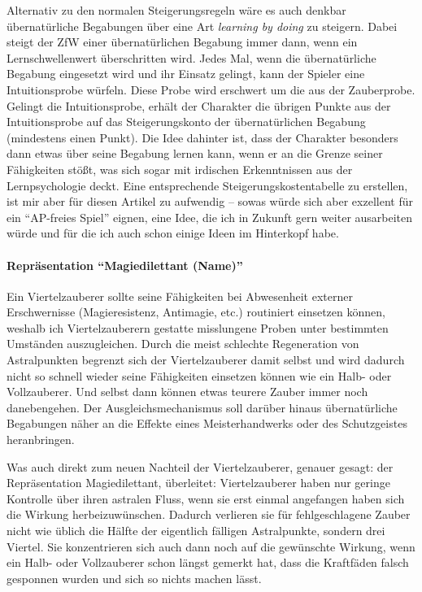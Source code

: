 Alternativ zu den normalen Steigerungsregeln wäre es auch denkbar übernatürliche Begabungen über eine Art \textit{learning by doing} zu steigern. Dabei steigt der ZfW einer übernatürlichen Begabung immer dann, wenn ein Lernschwellenwert überschritten wird. Jedes Mal, wenn die übernatürliche Begabung eingesetzt wird und ihr Einsatz gelingt, kann der Spieler eine Intuitionsprobe würfeln. Diese Probe wird erschwert um die \si{\ZfP*} aus der Zauberprobe. Gelingt die Intuitionsprobe, erhält der Charakter die übrigen Punkte aus der Intuitionsprobe auf das Steigerungskonto der übernatürlichen Begabung (mindestens einen Punkt). Die Idee dahinter ist, dass der Charakter besonders dann etwas über seine Begabung lernen kann, wenn er an die Grenze seiner Fähigkeiten stößt, was sich sogar mit irdischen Erkenntnissen aus der Lernpsychologie deckt. Eine entsprechende Steigerungskostentabelle zu erstellen, ist mir aber für diesen Artikel zu aufwendig -- sowas würde sich aber exzellent für ein \enquote{AP-freies Spiel} eignen, eine Idee, die ich in Zukunft gern weiter ausarbeiten würde und für die ich auch schon einige Ideen im Hinterkopf habe.

\paragraph{Repräsentation \enquote{Magiedilettant (Name)}}
Ein Viertelzauberer sollte seine Fähigkeiten bei Abwesenheit externer Erschwernisse (Magieresistenz, Antimagie, etc.) routiniert einsetzen können, weshalb ich Viertelzauberern gestatte misslungene Proben unter bestimmten Umständen auszugleichen. Durch die meist schlechte Regeneration von Astralpunkten begrenzt sich der Viertelzauberer damit selbst und wird dadurch nicht so schnell wieder seine Fähigkeiten einsetzen können wie ein Halb- oder Vollzauberer. Und selbst dann können etwas teurere Zauber immer noch danebengehen. Der Ausgleichsmechanismus soll darüber hinaus übernatürliche Begabungen näher an die Effekte eines Meisterhandwerks oder des Schutzgeistes heranbringen.

Was auch direkt zum neuen Nachteil der Viertelzauberer, genauer gesagt: der Repräsentation Magiedilettant, überleitet: Viertelzauberer haben nur geringe Kontrolle über ihren astralen Fluss, wenn sie erst einmal angefangen haben sich die Wirkung herbeizuwünschen. Dadurch verlieren sie für fehlgeschlagene Zauber nicht wie üblich die Hälfte der eigentlich fälligen Astralpunkte, sondern drei Viertel. Sie konzentrieren sich auch dann noch auf die gewünschte Wirkung, wenn ein Halb- oder Vollzauberer schon längst gemerkt hat, dass die Kraftfäden falsch gesponnen wurden und sich so nichts machen lässt.

